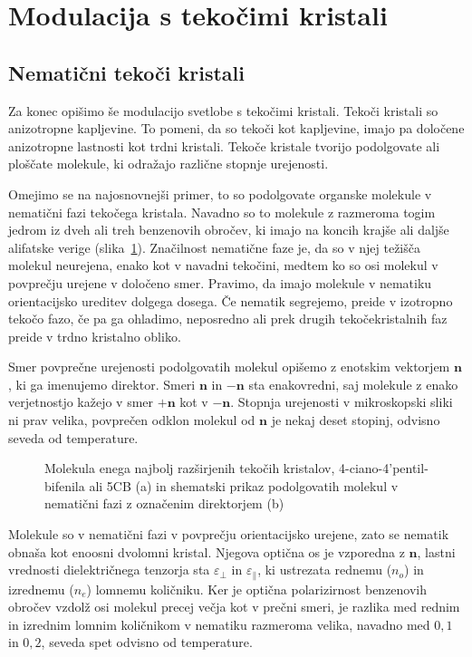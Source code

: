 \section{Modulacija s tekočimi kristali}

\subsection*{Nematični tekoči kristali}
Za konec opišimo še modulacijo svetlobe s tekočimi kristali. 
Tekoči kristali so anizotropne kapljevine. To pomeni, da so tekoči kot 
kapljevine, imajo pa določene anizotropne lastnosti kot trdni kristali. 
Tekoče kristale tvorijo podolgovate ali ploščate molekule, 
ki odražajo različne stopnje urejenosti. 

Omejimo se na najosnovnejši
primer, to so podolgovate organske molekule v nematični fazi tekočega kristala. 
Navadno so to molekule z razmeroma togim jedrom iz
dveh ali treh benzenovih obročev, ki imajo na koncih krajše ali daljše
alifatske verige (slika~\ref{fig:5CB}). Značilnost nematične faze je, da
so v njej težišča molekul neurejena, enako kot v navadni tekočini, medtem ko so 
osi molekul v povprečju urejene v določeno smer. Pravimo, da imajo molekule
v nematiku orientacijsko ureditev dolgega dosega. Če nematik segrejemo,
preide v izotropno tekočo fazo, če pa ga ohladimo, neposredno ali prek drugih
tekočekristalnih faz preide v trdno kristalno obliko. 

Smer povprečne urejenosti podolgovatih molekul opišemo z enotskim vektorjem 
$\mathbf{n}$, ki ga imenujemo direktor. 
Smeri $\mathbf{n}$ in $-\mathbf{n}$ sta 
enakovredni, saj molekule z enako verjetnostjo kažejo v smer $+\mathbf{n}$ kot 
v $-\mathbf{n}$. Stopnja urejenosti v mikroskopski sliki ni prav velika, povprečen
odklon molekul od $\mathbf{n}$ je nekaj deset stopinj, odvisno seveda od temperature.
\begin{figure}[h]
\centering
\def\svgwidth{90truemm}

\caption{Molekula enega najbolj razširjenih tekočih kristalov, 4-ciano-4'pentil-bifenila 
ali 5CB (a) in shematski prikaz podolgovatih molekul v nematični fazi z označenim direktorjem (b)}
\label{fig:5CB}
\end{figure}

Molekule so v nematični fazi v povprečju orientacijsko urejene, zato se nematik
obnaša kot enoosni dvolomni kristal. Njegova optična os je vzporedna 
z $\mathbf{n}$, lastni vrednosti dielektričnega tenzorja sta $\varepsilon_\bot$ in
$\varepsilon_{\parallel}$, ki ustrezata rednemu ($n_o$) in izrednemu ($n_e$) 
lomnemu količniku.
Ker je optična polarizirnost benzenovih obročev vzdolž osi molekul precej večja kot
v prečni smeri, je razlika med rednim in izrednim lomnim količnikom v nematiku razmeroma 
velika, navadno med $0,1$ in $0,2$, seveda spet odvisno od temperature.

